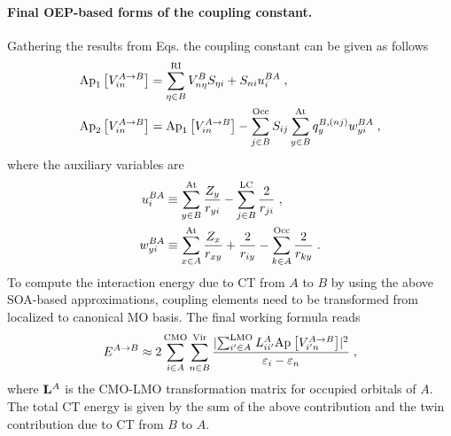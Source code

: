 \paragraph{Final OEP-based forms of the coupling constant.}
Gathering the results from Eqs. the coupling constant
can be given as follows
%
\begin{subequations}
\begin{align} \label{e:ct-murell-etal.vin.oep}
\Approx{ V_{in}^{A\rightarrow B} }{1}
       &= \sum_{\eta\in B}^{\rm RI} V^B_{n\eta} S_{\eta i} 
 +
S_{ni} u_i^{BA} \;, \\
%
\Approx{ V_{in}^{A\rightarrow B} }{2} &=
\Approx{ V_{in}^{A\rightarrow B} }{1} -
  \sum_{j   \in B}^{\rm Occ} S_{ij}
  \sum_{y   \in B}^{\rm At} q_y^{B,(nj)} w_{yi}^{BA}
\;,
\end{align}
\end{subequations}
%
where the auxiliary variables are
%
\begin{subequations}
\begin{align} \label{e:ct-murell-etal.vin.oep.aux-var}
 u_i^{BA} &\equiv    
 \sum_{y\in B}^{\rm At}
  \frac{Z_y}{ r_{yi} } 
 -
 \sum_{j\in B}^{\rm LC}
  \frac{2}{r_{ji}} 
                \;, \\
 w_{yi}^{BA} &\equiv 
   \sum_{x\in A}^{\rm At}
   \frac{Z_x}{r_{xy}}
  + \frac{2}{r_{iy}}
  - \sum_{k\in A}^{\rm Occ}
    \frac{2}{r_{ky}} 
                \;.
\end{align}
\end{subequations}
%
To compute the interaction energy due to CT from $A$ to $B$ by using the above SOA\hyp{}based
approximations, coupling elements need to be transformed from localized to canonical MO basis.
The final working formula reads
%
\begin{equation} \label{e:ect-oep.final}
 E^{A\rightarrow B} \approx
 2 
 \sum_{i\in A}^{\rm CMO}
 \sum_{n\in B}^{\rm Vir}
 \frac{
 \lvert
   \sum_{i'\in A}^{\rm LMO} L_{ii'}^A
   \text{Ap}_{} \left[ {V_{i'n}^{A\rightarrow B}} \right]  
 \rvert^2 }{\varepsilon_i - \varepsilon_n} \;,
\end{equation}
%
where ${\bf L}^A$ is the CMO\hyp{}LMO transformation matrix for occupied orbitals of $A$. 
The total CT energy is given by the sum of the above contribution and the twin contribution
due to CT from $B$ to $A$.

